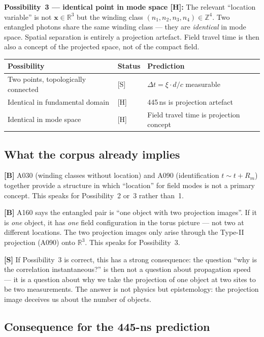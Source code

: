 \textbf{Possibility~3 --- identical point in mode space [H]:}
The relevant ``location variable'' is not $\mathbf{x} \in \mathbb{R}^3$
but the winding class $(n_1, n_2, n_3, n_4) \in \mathbb{Z}^4$. Two
entangled photons share the same winding class --- they are
\emph{identical} in mode space. Spatial separation is entirely a
projection artefact. Field travel time is then also a concept of the
projected space, not of the compact field.

\begin{center}
\small
\begin{tabular}{p{4.5cm}p{2.5cm}p{4cm}}
\toprule
\textbf{Possibility} & \textbf{Status} & \textbf{Prediction} \\
\midrule
Two points, topologically connected & [S] &
  $\Delta t = \xi \cdot d/c$ measurable \\
Identical in fundamental domain & [H] &
  445\,ns is projection artefact \\
Identical in mode space & [H] &
  Field travel time is projection concept \\
\bottomrule
\end{tabular}
\end{center}

\subsection{What the corpus already implies}

\textbf{[B]} A030 (winding classes without location) and A090
(identification $t \sim t + R_m$) together provide a structure in
which ``location'' for field modes is not a primary concept. This
speaks for Possibility~2 or~3 rather than~1.

\textbf{[B]} A160 says the entangled pair is ``one object with two
projection images''. If it is \emph{one} object, it has \emph{one}
field configuration in the torus picture --- not two at different
locations. The two projection images only arise through the Type-II
projection (A090) onto $\mathbb{R}^3$. This speaks for Possibility~3.

\textbf{[S]} If Possibility~3 is correct, this has a strong
consequence: the question ``why is the correlation instantaneous?''
is then not a question about propagation speed --- it is a question
about why we take the projection of one object at two sites to be
two measurements. The answer is not physics but epistemology: the
projection image deceives us about the number of objects.

\subsection{Consequence for the 445-ns prediction}

